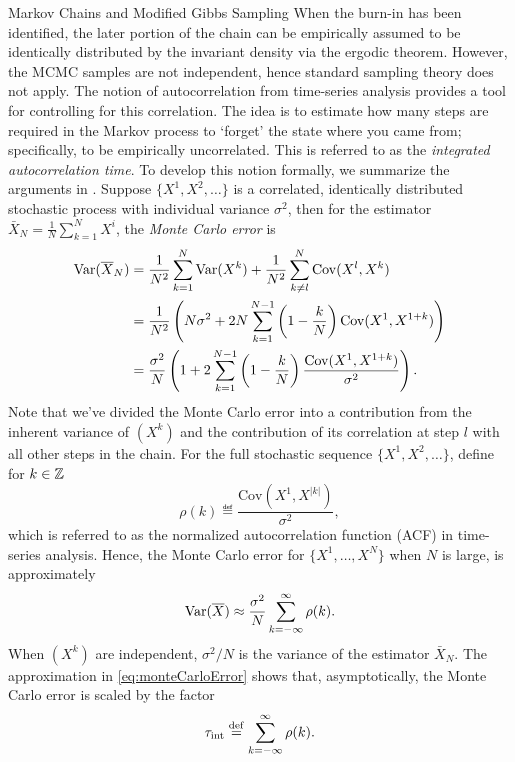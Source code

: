 \begin{chapter}{Markov Chains and Modified Gibbs Sampling}
When the burn-in has been identified, the later portion of the chain can be empirically assumed to be identically distributed by the invariant density via the ergodic theorem. 
However, the MCMC samples are not independent, hence standard sampling theory does not apply.
The notion of autocorrelation from time-series analysis provides a tool for controlling for this correlation.
The idea is to estimate how many steps are required in the Markov process to `forget' the state where you came from; specifically, to be empirically uncorrelated.
This is referred to as the \emph{integrated autocorrelation time}.
To develop this notion formally, we summarize the arguments in \citep{sokal1997monte}. 
Suppose $\{X^1,X^2,\dots\}$ is a correlated, identically distributed stochastic process with individual variance $\sigma^2$, then for the estimator $\bar X_N=\frac1N\sum_{k=1}^NX^i$, the {\em Monte Carlo error} is  
\begin{align}
{\rm Var}(\bar X_N)
  &=\frac{1}{N^2}\sum_{k=1}^N{\rm Var}(X^k)+\frac{1}{N^2}\sum_{k\neq l}^N {\rm Cov}(X^l,X^k)\nonumber\\
  &=\frac{1}{N^2}\left(N\sigma^2+2N\sum_{k=1}^{N-1}\left(1-\frac{k}{N}\right){\rm Cov}(X^1,X^{1+k})\right)\nonumber\\
  &=\frac{\sigma^2}{N}\left(1+2\sum_{k=1}^{N-1}\left(1-\frac{k}{N}\right)\frac{{\rm Cov}(X^1,X^{1+k})}{\sigma^2}\right).
\end{align}
Note that we've divided the Monte Carlo error into a contribution from the inherent variance of $(X^k)$ and the contribution of its correlation at step $l$ with all other steps in the chain.
For the full stochastic sequence $\{X^1,X^2,\dots\}$, define for $k \in \Z$
\begin{equation}
  \rho(k) \eqdef \frac{\mathrm{Cov}(X^1, X^{|k|})}{\sigma^2},
\end{equation}
which is referred to as the normalized autocorrelation function (ACF) in time-series analysis.
Hence, the Monte Carlo error for $\{X^1,\dots,X^N\}$ when $N$ is large, is approximately 
\begin{equation} \label{eq:monteCarloError}
{\rm Var}(\bar X) \approx \frac{\sigma^2}{N}\sum_{k=-\infty}^\infty \rho(k).
\end{equation}
When $(X^k)$ are independent, $\sigma^2/N$ is the variance of the estimator $\bar X_N$.
The approximation in \eqref{eq:monteCarloError} shows that, asymptotically, the Monte Carlo error is scaled by the factor
\begin{equation}
  \tau_{\rm int}\eqdef \sum_{k=-\infty}^\infty \rho(k).

\end{equation}
\end{chapter}
